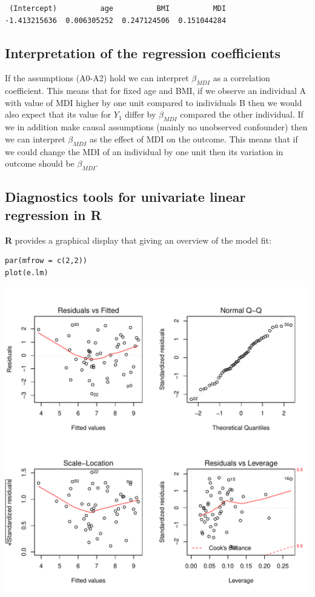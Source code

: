 \documentclass{article}
\newcommand\Rlogo{\textbf{\textsf{R}}}
\begin{document}
\begin{verbatim}
 (Intercept)          age          BMI          MDI 
-1.413215636  0.006305252  0.247124506  0.151044284
\end{verbatim}

\subsection{Interpretation of the regression coefficients}
\label{sec:interpretationLM}
If the assumptions (A0-A2) hold we can interpret \(\beta_{MDI}\) as a
correlation coefficient. This means that for fixed age and BMI, if we
observe an individual A with value of MDI higher by one unit compared
to individuals B then we would also expect that its value for \(Y_1\)
differ by \(\beta_{MDI}\) compared the other individual. If we in
addition make causal assumptions (mainly no unobserved confounder)
then we can interpret \(\beta_{MDI}\) as the effect of MDI on the
outcome. This means that if we could change the MDI of an individual
by one unit then its variation in outcome should be \(\beta_{MDI}\).

\clearpage

\subsection{Diagnostics tools for univariate linear regression in \Rlogo{}}
\label{sec:diagLM}
\Rlogo{} provides a graphical display that giving an overview of the
model fit:
\lstset{language=r,label= ,caption= ,captionpos=b,numbers=none}
\begin{lstlisting}
par(mfrow = c(2,2))
plot(e.lm)
\end{lstlisting}

\begin{center}
\includegraphics[width=.9\linewidth]{./figures/diag-lm.pdf}
\end{center}
\end{document}
